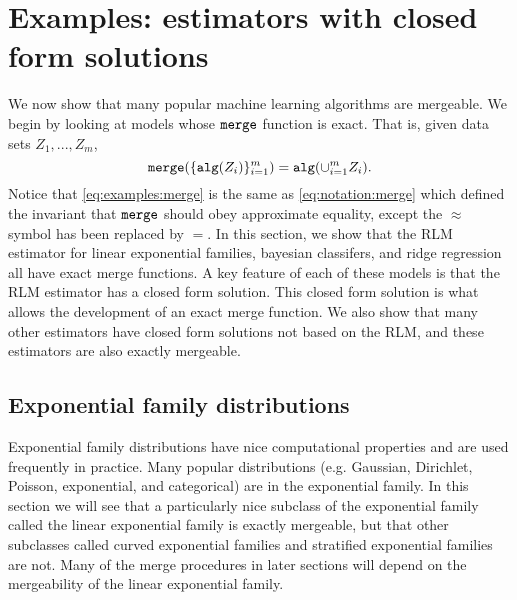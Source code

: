 \documentclass[thesis.tex]{subfiles}
\newcommand{\merge}{\mkprocedure{merge}}
\newcommand{\alg}{\mkprocedure{alg}}
\begin{document}

\section{Examples: estimators with closed form solutions}
\label{sec:merge:cf}

We now show that many popular machine learning algorithms are mergeable.
We begin by looking at models whose $\merge$ function is exact.
That is, given data sets $Z_1,...,Z_m$,
\begin{equation}
    \label{eq:examples:merge}
    \merge(\{\alg(Z_i)\}_{i=1}^m) = \alg(\cup_{i=1}^m Z_i)
    .
\end{equation}
Notice that \eqref{eq:examples:merge} is the same as \eqref{eq:notation:merge} which defined the invariant that $\merge$ should obey approximate equality,
except the $\approx$ symbol has been replaced by $=$.
In this section, we show that the RLM estimator for linear exponential families, bayesian classifers, and ridge regression all have exact merge functions.
A key feature of each of these models is that the RLM estimator has a closed form solution.
This closed form solution is what allows the development of an exact merge function.
We also show that many other estimators have closed form solutions not based on the RLM,
and these estimators are also exactly mergeable.


\subsection{Exponential family distributions}
\label{sec:merge:ef}


Exponential family distributions have nice computational properties and are used frequently in practice.
Many popular distributions (e.g. Gaussian, Dirichlet, Poisson, exponential, and categorical) are in the exponential family.
In this section we will see that a particularly nice subclass of the exponential family called the linear exponential family is exactly mergeable,
but that other subclasses called curved exponential families and stratified exponential families are not.
Many of the merge procedures in later sections will depend on the mergeability of the linear exponential family.
\end{document}
